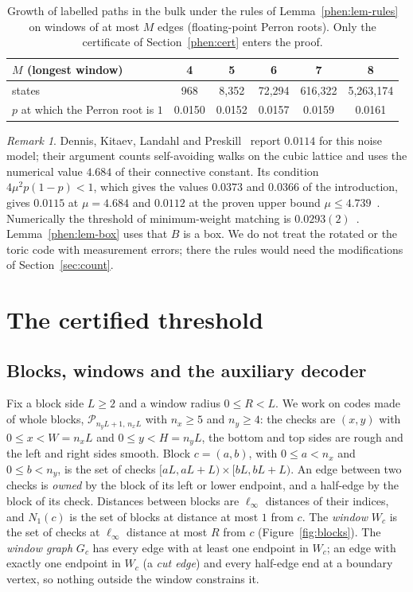 \documentclass[11pt]{amsart}
\theoremstyle{definition}
\theoremstyle{remark}
\newtheorem{remark}[theorem]{Remark}
\numberwithin{equation}{section}
\begin{document}
\begin{table}[h]
\centering
\begin{tabular}{lccccc}
\toprule
$M$ (longest window) & 4 & 5 & 6 & 7 & 8\\
\midrule
states & 968 & 8{,}352 & 72{,}294 & 616{,}322 & 5{,}263{,}174\\
$p$ at which the Perron root is $1$ & 0.0150 & 0.0152 & 0.0157 & 0.0159 & 0.0161\\
\bottomrule
\end{tabular}
\caption{Growth of labelled paths in the bulk under the rules of Lemma~\ref{phen:lem-rules} on windows of at most $M$
edges (floating-point Perron roots). Only the certificate of Section~\ref{phen:cert} enters the proof.}
\label{phen:tab}
\end{table}

\begin{remark}\label{phen:remarks}
Dennis, Kitaev, Landahl and Preskill~\cite{DKLP02} report $0.0114$ for this noise model; their argument
counts self-avoiding walks on the cubic lattice and uses the numerical value $4.684$ of their connective constant.
Its condition $4\mu^2p(1-p)<1$, which gives the values $0.0373$ and $0.0366$ of the introduction, gives $0.0115$
at $\mu=4.684$ and $0.0112$ at the proven upper bound $\mu\le4.739$~\cite{PT00}.
Numerically the threshold of minimum-weight matching is $0.0293(2)$~\cite{WHP03}. Lemma~\ref{phen:lem-box} uses that
$B$ is a box. We do not treat the rotated or the toric code with measurement errors; there the rules would need the
modifications of Section~\ref{sec:count}.
\end{remark}

\section{The certified threshold}\label{sec:cert}

\subsection{Blocks, windows and the auxiliary decoder}\label{sec:cert-decoder}
Fix a block side $L\ge2$ and a window radius $0\le R<L$. We work on codes made of whole blocks, $\mathcal P_{n_yL+1,\,n_xL}$ with $n_x\ge5$ and $n_y\ge4$: the checks are $(x,y)$ with $0\le x<W=n_xL$ and $0\le y<H=n_yL$, the bottom and top sides are rough and the left and right sides smooth. Block $c=(a,b)$, with $0\le a<n_x$ and $0\le b<n_y$, is the set of checks $[aL,aL+L)\times[bL,bL+L)$. An edge between two checks is \emph{owned} by the block of its left or lower endpoint, and a half-edge by the block of its check. Distances between blocks are $\ell_\infty$ distances of their indices, and $N_1(c)$ is the set of blocks at distance at most $1$ from $c$. The \emph{window} $W_c$ is the set of checks at $\ell_\infty$ distance at most $R$ from $c$ (Figure~\ref{fig:blocks}). The \emph{window graph} $G_c$ has every edge with at least one endpoint in $W_c$; an edge with exactly one endpoint in $W_c$ (a \emph{cut edge}) and every half-edge end at a boundary vertex, so nothing outside the window constrains it.
\end{document}
